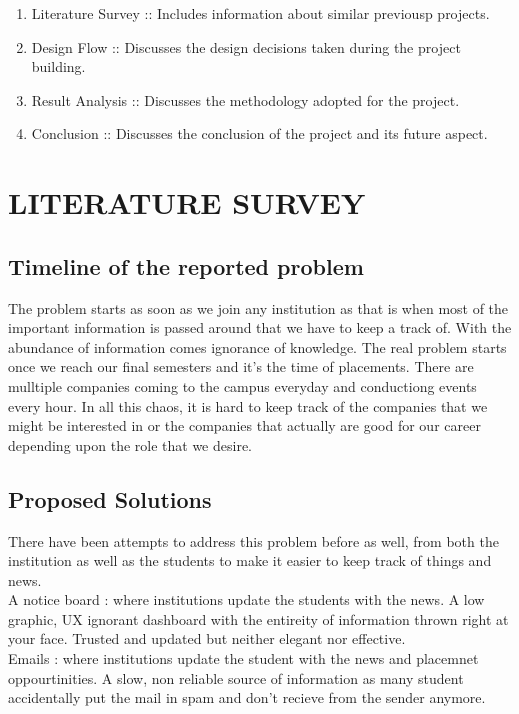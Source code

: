 \documentclass[14pt]{extarticle}
\begin{document}
\begin{enumerate}
    \item Literature Survey :: Includes information about similar previousp projects.
    \item Design Flow :: Discusses the design decisions taken during the project building.
    \item Result Analysis :: Discusses the methodology adopted for the project.
    \item Conclusion :: Discusses the conclusion of the project and its future aspect.
\end{enumerate}


\newpage
\section{LITERATURE SURVEY}

\subsection{Timeline of the reported problem}

The problem starts as soon as we join any institution as that is when most of the important information is passed around that we have to keep a track of. With the abundance of information comes ignorance of knowledge. The real problem starts once we reach our final semesters and it's the time of placements. There are mulltiple companies coming to the campus everyday and conductiong events every hour. In all this chaos, it is hard to keep track of the companies that we might be interested in or the companies that actually are good for our career depending upon the role that we desire.

\subsection{Proposed Solutions}

There have been attempts to address this problem before as well, from both the institution as well as the students to make it easier to keep track of things and news.  \\

A notice board : where institutions update the students with the news. A low graphic, UX ignorant dashboard with the entireity of information thrown right at your face. Trusted and updated but neither elegant nor effective. \\
Emails : where institutions update the student with the news and placemnet oppourtinities. A slow, non reliable source of information as many student accidentally put the mail in spam and don't recieve from the sender anymore. \\
\end{document}
